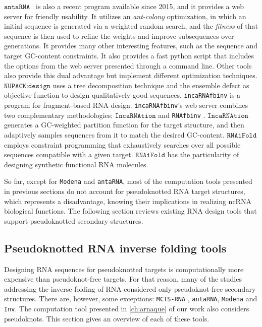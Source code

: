 \(\texttt{antaRNA}\)~\cite{kleinkauf2015antarna} is also a recent program available since 2015, and it provides a web server for friendly usability. It utilizes an \textit{ant-colony} optimization, in which an initial sequence is generated via a weighted random search, and the \textit{fitness} of that sequence is then used to refine the weights and improve subsequences over generations. It provides many other interesting features, such as the sequence and target GC-content constraints. It also provides a fast python script that includes the options from the web server presented through a command line. Other tools also provide this dual advantage but implement different optimization techniques. \(\texttt{NUPACK:design}\) \cite{zadeh2011nucleic} uses a tree decomposition technique and the ensemble defect as objective function to design qualitatively good sequences. \texttt{incaRNAfbinv} \cite{drory2016incarnafbinv} is a program for fragment-based \ac{RNA} design. \texttt{incaRNAfbinv}'s web server combines two complementary methodologies: \(\texttt{IncaRNAtion}\) \cite{reinharz2013} and \texttt{RNAfbinv} \cite{weinbrand2013rnafbinv}. \(\texttt{IncaRNAtion}\) generates a GC-weighted partition function for the target structure, and then adaptively samples sequences from it to match the desired GC-content. \(\texttt{RNAiFold}\) \cite{garcia2013rnaifold} employs constraint programming that exhaustively searches over all possible sequences compatible with a given target. \(\texttt{RNAiFold}\) \cite{garcia2013rnaifold} has the particularity of  designing synthetic functional \ac{RNA} molecules.  

So far, except for \texttt{Modena} and \texttt{antaRNA}, most of the computation tools presented in previous sections do not account for pseudoknotted RNA target structures, which represents a disadvantage, knowing their implications in realizing \ac{ncRNA} biological functions. The following section reviews existing RNA design tools that support pseudoknotted secondary structures. 


\subsection{Pseudoknotted RNA inverse folding tools}
Designing \ac{RNA} sequences for pseudoknotted targets is computationally more expensive than pseudoknot-free targets. For that reason, many of the studies addressing the inverse folding of \ac{RNA} considered only pseudoknot-free secondary structures. There are, however, some exceptions: \texttt{MCTS-RNA} \cite{yang2017rna}, \texttt{antaRNA}\cite{kleinkauf2015antarna}, \texttt{Modena} and \texttt{Inv}\cite{gao2010inverse}. The computation tool presented in \autoref{ch:arnaque} of our work also considers pseudoknots. This section gives an overview of each of these tools. 


